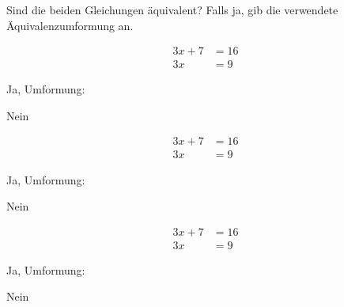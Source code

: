 \documentclass[solution]{uebungsblatt}
\begin{document}
\begin{exercise}
    Sind die beiden Gleichungen äquivalent? Falls ja, gib die verwendete Äquivalenzumformung an.
    \begin{multicols}{3}
        \begin{align*}
            3x+7&=16\\
            3x&=9
        \end{align*}
        \begin{multiplechoice}
            \citem Ja, Umformung: 
            \item Nein
        \end{multiplechoice}

        \begin{align*}
            3x+7&=16\\
            3x&=9
        \end{align*}
        \begin{multiplechoice}
            \item Ja, Umformung: \answerfield{1cm}{}
            \item Nein
        \end{multiplechoice}

        \begin{align*}
            3x+7&=16\\
            3x&=9
        \end{align*}
        \begin{multiplechoice}
            \item Ja, Umformung: \answerfield{1cm}{}
            \item Nein
        \end{multiplechoice}
    \end{multicols}
\end{exercise}
\fi
{}
\end{document}
